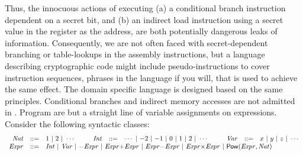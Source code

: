 Thus, the innocuous actions of executing (a) a conditional
branch instruction dependent on a secret bit, and (b) an
indirect load instruction using a secret value in the register as the
address, are both potentially dangerous leaks of information.
Consequently, we are not often
faced with secret-dependent branching or table-lookups in the assembly
instructions, but a language describing cryptographic code might
include pseudo-instructions to cover instruction sequences, phrases in
the language if you will, that is used to achieve the same effect.
The domain specific language \mydsl is designed based on the same
principles. Conditional branches and indirect memory accesses are not
admitted in \mydsl. Program are but a straight line of variable
assignments on expressions. 
Consider the following syntactic classes:
\[
\begin{array}{rclcrclcrcl}
  \Nat & ::= & {1}\ |\ {2}\ |\ \cdots
  & \hspace{.02\columnwidth} &
  \Int & ::= & \cdots \ |\ {-2}\ |\ {-1} \ |\ 0\ |\ 
             {1}\ |\ {2}\ |\ \cdots
  & \hspace{.02\columnwidth} &
  \Var & ::= & {x} \ |\ {y} \ |\ {z} \ |\ \cdots\\
  \Expr & ::= &  \multicolumn{9}{l}
               { \Int \ |\ \Var \ |\  {-}\Expr \ |\ 
                 \Expr {+} \Expr \ |\ \Expr {-} \Expr \ |\ 
                 \Expr {\times} \Expr \ |\ \dslcode{Pow} (\Expr, \Nat) }
\end{array}
\]

